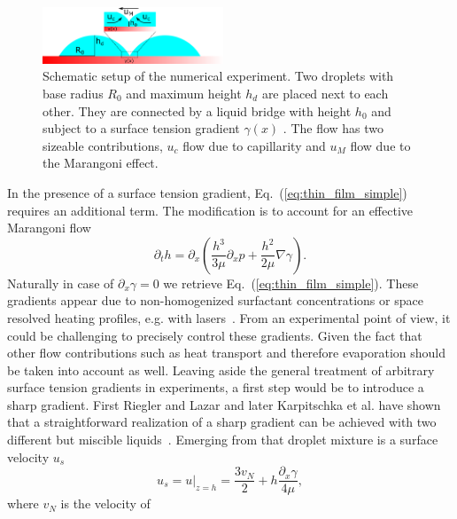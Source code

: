\documentclass[twocolumn,amsmath,amssymb,showpacs,pre,nofootinbib,superscriptaddress]{revtex4-1} %
\begin{document}
\begin{figure}
    \centering
    \includegraphics[width=0.48\textwidth]{Figures/setup.png}
    \caption{Schematic setup of the numerical experiment. 
    Two droplets with base radius $R_0$ and maximum height $h_d$ are placed next to each other. 
    They are connected by a liquid bridge with height $h_0$ and subject to a surface tension gradient $\gamma(x)$ .
    The flow has two sizeable contributions, $u_c$ flow due to capillarity and $u_M$ flow due to the Marangoni effect.
    }
    \label{fig:schematics}
\end{figure}
In the presence of a surface tension gradient, Eq.~(\ref{eq:thin_film_simple}) requires an additional term.
The modification is to account for an effective Marangoni flow~\cite{doi:10.1021/la500459v, karpitschka2014sharp, bestehorn20033d, doi:10.1021/la960488a}
\begin{equation}\label{eq:thin_with_marangoni}
    \partial_t h = \partial_x \left(\frac{h^3}{3\mu}\partial_x p + \frac{h^2}{2\mu}\nabla\gamma\right).
\end{equation}
Naturally in case of $\partial_x\gamma = 0$ we retrieve Eq.~(\ref{eq:thin_film_simple}).
These gradients appear due to non-homogenized surfactant concentrations or space resolved heating profiles, e.g. with lasers~\cite{doi:10.1021/la960488a, NIKOLOV2002325, bruning2018delayed, wedershoven2014infrared}.
From an experimental point of view, it could be challenging to precisely control these gradients.
Given the fact that other flow contributions such as heat transport and therefore evaporation should be taken into account as well.
Leaving aside the general treatment of arbitrary surface tension gradients in experiments, a first step would be to introduce a sharp gradient.
First Riegler and Lazar and later Karpitschka et al. have shown that a straightforward realization of a sharp gradient can be achieved with two different but miscible liquids~\cite{doi:10.1021/la800630w, karpitschka2014sharp, doi:10.1021/la500459v}. 
Emerging from that droplet mixture is a surface velocity $u_s$~\cite{PhysRevLett.109.066103}
\begin{equation}\label{eq:Karpitschka_vel}
    u_s = u|_{z=h} = \frac{3v_N}{2} + h\frac{\partial_x\gamma}{4\mu},
\end{equation}
where $v_N$ is the velocity of 
\end{document}
